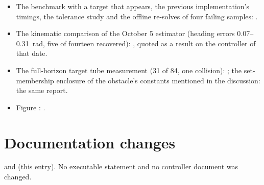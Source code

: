\documentclass[11pt]{article}
\begin{document}
\begin{itemize}
  20261010).
\item The benchmark with a target that appears, the previous
  implementation's timings, the tolerance study and the offline re-solves of
  four failing samples: .
\item The kinematic comparison of the October 5 estimator (heading errors
  0.07--0.31~rad, five of fourteen recovered): ,
  quoted as a result on the controller of that date.
\item The full-horizon target tube measurement (31 of 84, one collision):
  ; the set-membership enclosure of
  the obstacle's constants mentioned in the discussion: the same report.
\item Figure :
  .
\end{itemize}

\section{Documentation changes}
 and  (this entry). No
executable statement and no controller document was changed.
\end{document}
